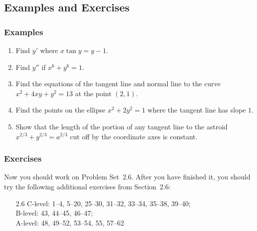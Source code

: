 \documentclass[serif,ignorenonframetext]{beamer}
\begin{document}
\subsection{Examples and Exercises}

\begin{frame}
  \frametitle{Examples}
  \begin{enumerate}
  \item Find $y'$ where $x\tan y = y-1$.
  \item Find $y''$ if $x^6+y^6=1$.
  \item Find the equations of the tangent line and normal line
    to the curve $x^2+4xy+y^2=13$ at the point $(2,1)$.
  \item Find the points on the ellipse $x^2+2y^2=1$ where the
    tangent line has slope $1$.
  \item Show that the length of the portion of any tangent
    line to the astroid $x^{2/3} + y^{2/3} = a^{2/3}$ cut off by
    the coordinate axes is constant.
  \end{enumerate} 
\end{frame}

\begin{frame}
  \frametitle{Exercises}
  Now you should work on Problem Set~2.6.  After you have finished it,
  you should try the following additional exercises from Section~2.6:
  \begin{itemize}
  \item[2.6] 
    C-level: 1--4, 5--20, 25--30, 31--32, 33--34, 35--38, 39--40; \\ 
    B-level: 43, 44--45, 46--47; \\
    A-level: 48, 49--52, 53--54, 55, 57--62
  \end{itemize}
\end{frame}
\end{document}
